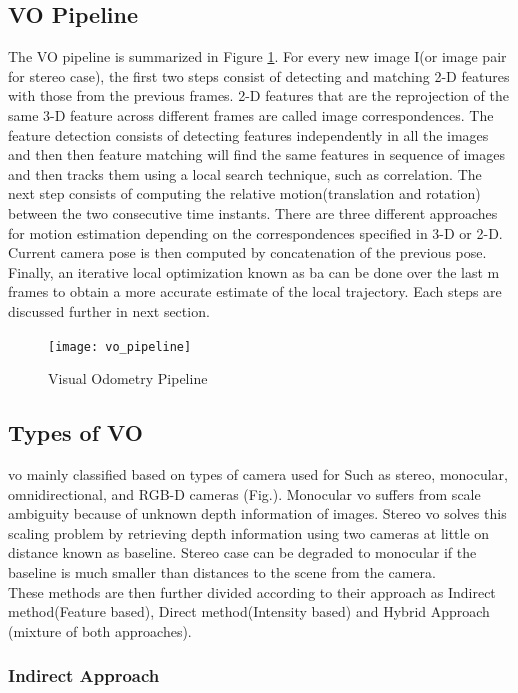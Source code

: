 \subsection{VO Pipeline}
The VO pipeline is summarized in Figure \ref{fig:flow}. For every new image I(or image pair for stereo case), the first two steps consist of detecting and matching 2-D features with those from the previous frames. 2-D features that are the reprojection of the same 3-D feature across different frames are called image correspondences. The feature detection consists of detecting features independently in all the images and then then feature matching will find the same features in sequence of images and then tracks them using a local search technique, such as correlation. The next step consists of computing the relative motion(translation and rotation) between the two consecutive time instants. There are three different approaches for motion estimation depending on the correspondences specified in 3-D or 2-D. Current camera pose is then computed by concatenation of the previous pose. Finally, an iterative local optimization known as \acrshort{ba} can be done over the last m frames to obtain a more accurate estimate of the local trajectory. Each steps are discussed further in next section.

\begin{figure}[h]
	\centering
	\texttt{[image: vo\_pipeline]}
	\caption{Visual Odometry Pipeline}
	\label{fig:flow}
\end{figure}

\subsection{Types of VO}
\label{section:vo_types}

\acrshort{vo} mainly classified based on types of camera used for Such as stereo, monocular, omnidirectional, and RGB-D cameras (Fig.). Monocular \acrshort{vo} suffers from scale ambiguity because of unknown depth information of images. Stereo \acrshort{vo} solves this scaling problem by retrieving depth information using two cameras at little on distance known as baseline. Stereo case can be degraded to monocular if the baseline is much smaller than distances to the scene from the camera.\\
These methods are then further divided according to their approach as Indirect method(Feature based), Direct method(Intensity based) and Hybrid Approach (mixture of both approaches).

\subsubsection{Indirect Approach}


